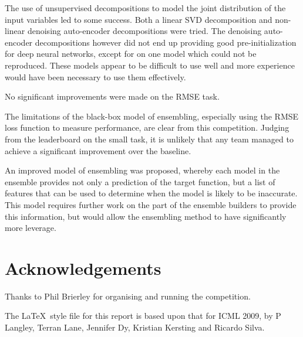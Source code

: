 \documentclass{article}
\begin{document}
The use of unsupervised decompositions to model the joint distribution of the input variables led to some success.  Both a linear SVD decomposition and non-linear denoising auto-encoder decompositions were tried.  The denoising auto-encoder decompositions however did not end up providing good pre-initialization for deep neural networks, except for on one model which could not be reproduced.  These models appear to be difficult to use well and more experience would have been necessary to use them effectively.

No significant improvements were made on the RMSE task.

The limitations of the black-box model of ensembling, especially using the RMSE loss function to measure performance, are clear from this competition.  Judging from the leaderboard on the small task, it is unlikely that any team managed to achieve a significant improvement over the baseline.

An improved model of ensembling was proposed, whereby each model in the ensemble provides not only a prediction of the target function, but a list of features that can be used to determine when the model is likely to be inaccurate.  This model requires further work on the part of the ensemble builders to provide this information, but would allow the ensembling method to have significantly more leverage.

\section*{Acknowledgements} 

Thanks to Phil Brierley for organising and running the competition.

The \LaTeX\ style file for this report is based upon that for ICML 2009, by P Langley, Terran Lane, Jennifer Dy, Kristian Kersting and Ricardo Silva.




\end{document}
